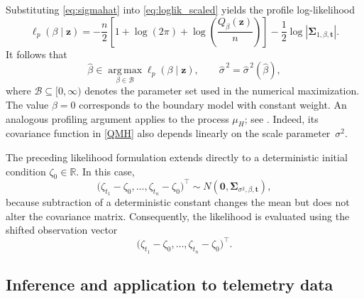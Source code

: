 \documentclass[preprint,12pt,authoryear]{elsarticle}
\begin{document}
Substituting \eqref{eq:sigmahat} into
\eqref{eq:loglik_scaled} yields the profile log-likelihood
\begin{equation}\label{eq:profile_beta}
\ell_p(\beta\mid\bm z)
=
-\frac{n}{2}
\left[
1+\log(2\pi)
+\log\!\left(
\frac{Q_\beta(\bm z)}{n}
\right)
\right]
-\frac12
\log\left|
\bm\Sigma_{1,\beta,\bm t}
\right|.
\end{equation}
It follows that
\begin{equation}\label{eq:betahat}
\widehat{\beta}
\in
\operatorname*{arg\,max}_{\beta\in\mathcal B}
\ell_p(\beta\mid\bm z),
\qquad
\widehat{\sigma}^{\,2}
=
\widehat{\sigma}^{\,2}(\widehat{\beta}),
\end{equation}
where \(\mathcal B\subseteq[0,\infty)\) denotes the parameter set used
in the numerical maximization. The value \(\beta=0\) corresponds to the
boundary model with constant weight.
\newpage
An analogous profiling argument applies to the process \(\mu_H\); see
\citet[Section~4]{JY}. Indeed, its covariance function in \eqref{QMH}
also depends linearly on the scale parameter~\(\sigma^2\).

\begin{rem}
The preceding likelihood formulation extends directly to a deterministic
initial condition \(\zeta_0\in\mathbb R\). In this case,
\[
\big(
\zeta_{t_1}-\zeta_0,\ldots,\zeta_{t_n}-\zeta_0
\big)^\top
\sim
N\!\left(
\bm 0,
\bm\Sigma_{\sigma^2,\beta,\bm t}
\right),
\]
because subtraction of a deterministic constant changes the mean but
does not alter the covariance matrix. Consequently, the likelihood is
evaluated using the shifted observation vector
\[
\big(
\zeta_{t_1}-\zeta_0,\ldots,\zeta_{t_n}-\zeta_0
\big)^\top.
\]
\end{rem}







\subsection{Inference and application to telemetry data}\label{bat}
\end{document}
